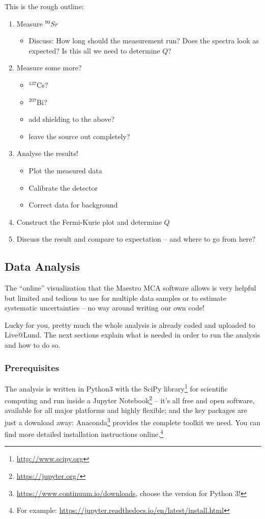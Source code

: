 \documentclass[a4,11pt, notitlepage]{article}
\begin{document}
This is the rough outline:
\begin{enumerate}
\item Measure $^{90}Sr$
  \begin{itemize}
  \item Discuss: How long should the measurement run? Does the spectra
    look as expected? Is this all we need to determine $Q$?
  \end{itemize}
\item Measure some more?
  \begin{itemize}
  \item $^{137}$Cs?
  \item $^{207}$Bi?
  \item add shielding to the above?
  \item leave the source out completely?
  \end{itemize}
\item Analyse the results!
  \begin{itemize}
  \item Plot the measured data
  \item Calibrate the detector
  \item Correct data for background
  \end{itemize}
\item Construct the Fermi-Kurie plot and determine $Q$
\item Discuss the result and compare to expectation -- and where to go
  from here?
\end{enumerate}

\subsection{Data Analysis}
\label{sec:data-analysis}

The ``online'' visualization that the Maestro MCA software allows is
very helpful but limited and tedious to use for multiple data samples
or to estimate systematic uncertainties
-- no way around writing our own code!

Lucky for you, pretty much the whole analysis is already coded and
uploaded to Live@Lund. The next
sections explain what is needed in order to run the analysis and how
to do so.

\subsubsection{Prerequisites}
\label{sec:prerequisites}

The analysis is written in Python3 with the SciPy
library\footnote{\url{http://www.scipy.org}} for scientific computing and run
inside a Jupyter Notebook\footnote{\url{https://jupyter.org/}} -- it's all
  free and open software, available for all major platforms and
  highly flexible; and the key packages are just a download away:
  Anaconda\footnote{\url{https://www.continuum.io/downloads}, choose the version
    for Python 3!} provides the complete toolkit we need.
  You can find more detailed installation instructions online.\footnote{For
  example: \url{https://jupyter.readthedocs.io/en/latest/install.html}}
\end{document}
